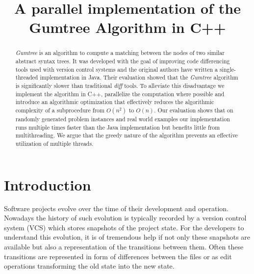 \documentclass[letterpaper]{article}
\title{A parallel implementation of the Gumtree Algorithm in C++}
\begin{document}
%
\maketitle
%

\begin{abstract}

\emph{Gumtree} is an algorithm to compute a matching between the nodes of two similar abstract syntax trees.
It was developed with the goal of improving code differencing tools used with version control systems and the original authors have written a single-threaded implementation in Java.
Their evaluation showed that the \emph{Gumtree} algorithm is significantly slower than traditional \emph{diff} tools.
To alleviate this disadvantage we implement the algorithm in C++, parallelize the computation where possible and introduce an algorithmic optimization that effectively reduces the algorithmic complexity of a subprocedure  from $O(n^2)$ to $O(n)$.
Our evaluation shows that on randomly generated problem instances and real world examples our implementation runs multiple times faster than the Java implementation but benefits little from multithreading.
We argue that the greedy nature of the algorithm prevents an effective utilization of multiple threads.
\end{abstract}

\section{Introduction}\label{sec:intro}


Software projects evolve over the time of their development and operation.
Nowadays the history of such evolution is typically recorded by a version control system (VCS) which stores snapshots of the project state.
For the developers to understand this evolution, it is of tremendous help if not only these snapshots are available but also a representation of the transitions between them.
Often these transitions are represented in form of differences between the files or as edit operations transforming the old state into the new state.
\end{document}
